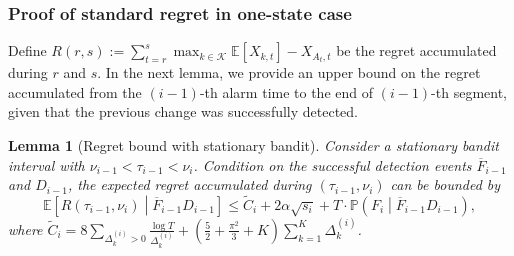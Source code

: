 \documentclass[twoside]{article}
\def\gK{{\mathcal{K}}}
\newcommand{\E}{\mathbb{E}}
\theoremstyle{plain}
\newtheorem{lemma}[theorem]{Lemma}
\theoremstyle{definition}
\theoremstyle{remark}
\begin{document}
\subsubsection{Proof of standard regret in one-state case}

Define $R\left(r,s\right) :=\sum^{s}_{t=r}\max_{k\in\gK}\E\left[X_{k,t}\right]-X_{A_{t},t}$ be the regret accumulated during $r$ and $s$. In the next lemma, we provide an upper bound on the regret accumulated from the $\left(i-1\right)$-th alarm time to the end of $\left(i-1\right)$-th segment, given that the previous change was successfully detected.

\begin{lemma}[Regret bound with stationary bandit]\label{applemma:regret_stat} 
Consider a stationary bandit interval with $\nu_{i-1}<\tau_{i-1}<\nu_{i}$. Condition on the successful detection events $\overline{F}_{i-1}$ and $D_{i-1}$, the expected regret accumulated during $\left(\tau_{i-1},\nu_{i}\right)$ can be bounded by
\begin{equation}
    \E\left[R\left(\tau_{i-1},\nu_{i}\right)\middle|\overline{F}_{i-1}D_{i-1} \right]\leq \tilde{C}_{i}+2\alpha\sqrt{s_{i}}+T\cdot \mathbb{P}\left(F_{i}\middle|\overline{F}_{i-1}D_{i-1}\right),\label{eqn:one_seg_regret}
\end{equation}
where $\tilde{C}_{i}=8\sum_{\Delta^{\left(i\right)}_{k}>0}\frac{\log T}{\Delta^{\left(i\right)}_{k}}+\left(\frac{5}{2}+\frac{\pi^{2}}{3}+K\right)\sum^{K}_{k=1}\Delta^{\left(i\right)}_{k}$.
\end{lemma}
\end{document}
